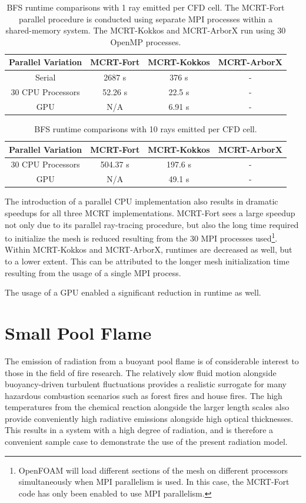 \begin{table}[h!]
\centering
\begin{tabular}{||c c c c||} 
 \hline
 Parallel Variation & MCRT-Fort & MCRT-Kokkos & MCRT-ArborX \\ [0.5ex] 
 \hline\hline
 Serial & 2687 s & 376 s & - \\ 
 30 CPU Processors & 52.26 s & 22.5 s & - \\
 GPU & N/A & 6.91 s & - \\
 \hline
\end{tabular}
\caption{BFS runtime comparisons with 1 ray emitted per CFD cell. The MCRT-Fort parallel procedure is conducted using separate MPI processes within a shared-memory system. The MCRT-Kokkos and MCRT-ArborX run using 30 OpenMP processes.}
\label{table:BFS_runtime_table_1rpc}
\end{table}

\begin{table}[h!]
\centering
\begin{tabular}{||c c c c||} 
 \hline
 Parallel Variation & MCRT-Fort & MCRT-Kokkos & MCRT-ArborX \\ [0.5ex] 
 \hline\hline
 30 CPU Processors & 504.37 s & 197.6 s & - \\
 GPU & N/A & 49.1 s & - \\
 \hline
\end{tabular}
\caption{BFS runtime comparisons with 10 rays emitted per CFD cell.}
\label{table:BFS_runtime_table_10rpc}
\end{table}


The introduction of a parallel CPU implementation also results in dramatic speedups for all three MCRT implementations. MCRT-Fort sees a large speedup not only due to its parallel ray-tracing procedure, but also the long time required to initialize the mesh is reduced resulting from the 30 MPI processes used\footnote{OpenFOAM will load different sections of the mesh on different processors simultaneously when MPI parallelism is used. In this case, the MCRT-Fort code has only been enabled to use MPI parallelism.}.
Within MCRT-Kokkos and MCRT-ArborX, runtimes are decreased as well, but to a lower extent. This can be attributed to the longer mesh initialization time resulting from the usage of a single MPI process.

The usage of a GPU enabled a significant reduction in runtime as well. 


\section{Small Pool Flame}
The emission of radiation from a buoyant pool flame is of considerable interest to those in the field of fire research. 
The relatively slow fluid motion alongside buoyancy-driven turbulent fluctuations provides a realistic surrogate for many hazardous combustion scenarios such as forest fires and house fires.
The high temperatures from the chemical reaction alongside the larger length scales also provide conveniently high radiative emissions alongside high optical thicknesses. 
This results in a system with a high degree of radiation, and is therefore a convenient sample case to demonstrate the use of the present radiation model.

